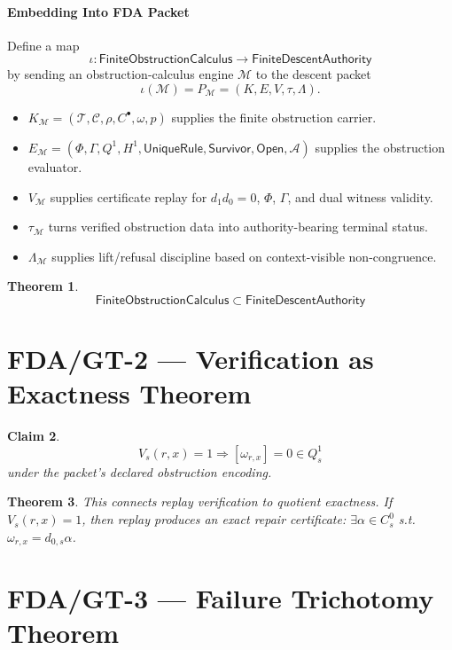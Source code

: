 \documentclass[11pt]{article}
\newtheorem{theorem}{Theorem}[section]
\newtheorem{claim}[theorem]{Claim}
\begin{document}
\paragraph{Embedding Into FDA Packet}
Define a map
\[
\iota:\mathsf{FiniteObstructionCalculus}\to\mathsf{FiniteDescentAuthority}
\]
by sending an obstruction-calculus engine \(\mathcal M\) to the descent packet
\[
\iota(\mathcal M)=P_{\mathcal M}=(K,E,V,\tau,\Lambda).
\]
\begin{itemize}
    \item \(K_{\mathcal M} = (\mathcal T,\mathcal C,\rho,C^\bullet,\omega,p)\) supplies the finite obstruction carrier.
    \item \(E_{\mathcal M} = (\Phi,\Gamma,Q^1,H^1,\mathsf{UniqueRule},\mathsf{Survivor},\mathsf{Open},\mathcal A)\) supplies the obstruction evaluator.
    \item \(V_{\mathcal M}\) supplies certificate replay for \(d_1d_0=0\), \(\Phi\), \(\Gamma\), and dual witness validity.
    \item \(\tau_{\mathcal M}\) turns verified obstruction data into authority-bearing terminal status.
    \item \(\Lambda_{\mathcal M}\) supplies lift/refusal discipline based on context-visible non-congruence.
\end{itemize}

\begin{theorem}
\[
\boxed{ \mathsf{FiniteObstructionCalculus} \subset \mathsf{FiniteDescentAuthority} }
\]
\end{theorem}

\section{FDA/GT-2 — Verification as Exactness Theorem}

\begin{claim}
\[
\boxed{ V_s(r,x)=1 \Rightarrow [\omega_{r,x}]=0\in Q^1_s }
\]
under the packet's declared obstruction encoding.
\end{claim}

\begin{theorem}
This connects replay verification to quotient exactness. If \(V_s(r,x)=1\), then replay produces an exact repair certificate: \(\exists \alpha\in C^0_s\) s.t. \(\omega_{r,x}=d_{0,s}\alpha\).
\end{theorem}

\section{FDA/GT-3 — Failure Trichotomy Theorem}
\end{document}
